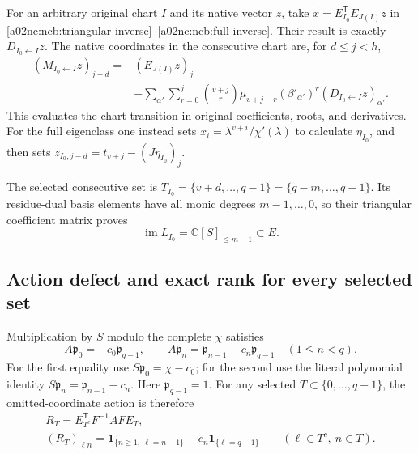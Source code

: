 \documentclass[11pt,a4paper]{article}
\begin{document}
For an arbitrary original chart $I$ and its native vector $z$, take
$x=E_{I_0}^{\mathsf T}E_{J(I)}z$ in
\eqref{a02nc:ncb:triangular-inverse}--\eqref{a02nc:ncb:full-inverse}. Their result
is exactly $D_{I_0\leftarrow I}z$. The native coordinates in the
consecutive chart are, for $d\leq j<h$,
\begin{equation}\tag{NCB28}\label{a02nc:ncb:explicit-transition}
\begin{split}
(M_{I_0\leftarrow I}z)_{j-d}
={}&(E_{J(I)}z)_j\\
&-\sum_{\alpha'}\sum_{r=0}^{j}
\binom{v+j}{r}\mu_{v+j-r}(\beta'_{\alpha'})^r
                    (D_{I_0\leftarrow I}z)_{\alpha'} .
\end{split}
\end{equation}
This evaluates the chart transition in original coefficients, roots,
and derivatives. For the full eigenclass one instead sets
$x_i=\lambda^{v+i}/\chi'(\lambda)$ to calculate $\eta_{I_0}$,
and then sets
$z_{I_0,j-d}=t_{v+j}-(J\eta_{I_0})_j$.

The selected consecutive set is
$T_{I_0}=\{v+d,\ldots,q-1\}=\{q-m,\ldots,q-1\}$.
Its residue-dual basis elements have all monic degrees
$m-1,\ldots,0$, so their triangular coefficient matrix proves
\begin{equation}\tag{NCB29}\label{a02nc:ncb:consecutive-image}
\operatorname{im}L_{I_0}=\mathbb C[S]_{\leq m-1}\subset E .
\end{equation}

\subsection{Action defect and exact rank for every selected set}
Multiplication by $S$ modulo the complete $\chi$ satisfies
\begin{equation}\tag{NCB30}\label{a02nc:ncb:action}
A\mathfrak p_0=-c_0\mathfrak p_{q-1},\qquad
A\mathfrak p_n=\mathfrak p_{n-1}-c_n\mathfrak p_{q-1}
\quad(1\leq n<q).
\end{equation}
For the first equality use $S\mathfrak p_0=\chi-c_0$;
for the second use the literal polynomial identity
$S\mathfrak p_n=\mathfrak p_{n-1}-c_n$.
Here $\mathfrak p_{q-1}=1$.
For any selected $T\subset\{0,\ldots,q-1\}$, the omitted-coordinate
action is therefore
\begin{equation}\tag{NCB31}\label{a02nc:ncb:RT}
\begin{gathered}
R_T=E_{T^c}^{\mathsf T}F^{-1}AFE_T,\\
(R_T)_{\ell n}
=\mathbf1_{\{n\geq1,\ \ell=n-1\}}
       -c_n\mathbf1_{\{\ell=q-1\}}
\qquad(\ell\in T^c,\ n\in T).
\end{gathered}
\end{equation}
\end{document}
